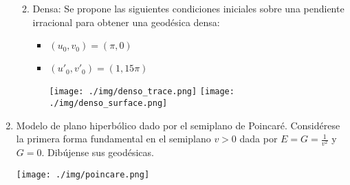 \documentclass[12pt,a4paper]{article}
\begin{document}
\begin{enumerate}
\begin{enumerate}
\begin{itemize}
    \end{itemize}
  \item Densa: Se propone las siguientes condiciones iniciales sobre una
    pendiente irracional para obtener una geodésica densa:
    \begin{itemize}
    \item $(u_0, v_0) = (\pi, 0) $
    \item $(u'_0, v'_0) = (1, 15\pi) $
      \begin{center}
        \texttt{[image: ./img/denso\_trace.png]}
        \texttt{[image: ./img/denso\_surface.png]}
      \end{center}
    \end{itemize}
  \end{enumerate}
\newpage{}
\item Modelo de plano hiperbólico dado por el semiplano de
  Poincaré. Considérese la primera forma fundamental en el semiplano
  $v>0$ dada por $E = G = \frac{1}{v^{2}}$ y $G = 0$. Dibújense sus
  geodésicas. 
  \begin{center}
    \texttt{[image: ./img/poincare.png]}
  \end{center}

\end{enumerate}
\end{document}
